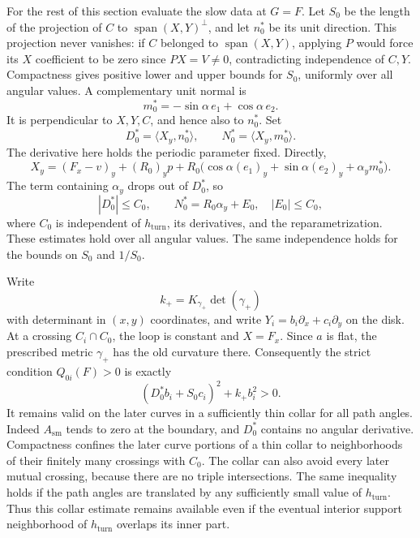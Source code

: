 For the rest of this section evaluate the slow data at $G=F$.
Let $S_0$ be the length of the projection of $C$ to
$\operatorname{span}(X,Y)^\perp$, and let $n_0^*$ be its unit direction.
This projection never vanishes: if $C$ belonged to
$\operatorname{span}(X,Y)$, applying $P$ would force its $X$ coefficient
to be zero since $PX=V\ne0$, contradicting independence of $C,Y$.
Compactness gives positive lower and upper bounds for $S_0$, uniformly
over all angular values.  A complementary unit normal is
\[
 m_0^*=-\sin\alpha\,e_1+\cos\alpha\,e_2.
\]
It is perpendicular to $X,Y,C$, and hence also to $n_0^*$.  Set
\begin{equation}
 D_0^*=\langle X_y,n_0^*\rangle,
 \qquad N_0^*=\langle X_y,m_0^*\rangle.
 \label{eq:limiting-mixed-components}
\end{equation}
The derivative here holds the periodic parameter fixed.  Directly,
\[
 X_y=(F_x-v)_y+(R_0)_yp+
 R_0\bigl(\cos\alpha(e_1)_y+\sin\alpha(e_2)_y
                    +\alpha_y m_0^*\bigr).
\]
The term containing $\alpha_y$ drops out of $D_0^*$, so
\begin{equation}
 |D_0^*|\le C_0,
 \qquad N_0^*=R_0\alpha_y+E_0,\quad |E_0|\le C_0,
 \label{eq:derivative-independent-bounds}
\end{equation}
where $C_0$ is independent of $h_{\mathrm{turn}}$, its derivatives,
and the reparametrization.  These estimates hold over all angular
values.  The same independence holds for the bounds on $S_0$ and
$1/S_0$.

Write
\[
 k_+=K_{\gamma_+}\det(\gamma_+)
\]
with determinant in $(x,y)$ coordinates, and write
$Y_i=b_i\partial_x+c_i\partial_y$ on the disk.  At a crossing
$C_i\cap C_0$, the loop is constant and $X=F_x$.  Since $a$ is flat,
the prescribed metric $\gamma_+$ has the old curvature there.
Consequently the strict condition $Q_{0i}(F)>0$ is exactly
\begin{equation}
 (D_0^*b_i+S_0c_i)^2+k_+b_i^2>0.
 \label{eq:collar-inequality}
\end{equation}
It remains valid on the later curves in a sufficiently thin collar for
all path angles.  Indeed $A_{\mathrm{sm}}$ tends to zero at the boundary,
and $D_0^*$ contains no angular derivative.  Compactness confines the
later curve portions of a thin collar to neighborhoods of their
finitely many crossings with $C_0$.  The collar can also avoid every
later mutual crossing, because there are no triple intersections.
The same inequality holds if the path angles are translated by any
sufficiently small value of $h_{\mathrm{turn}}$.  Thus this collar
estimate remains available even if the eventual interior support
neighborhood of $h_{\mathrm{turn}}$ overlaps its inner part.

